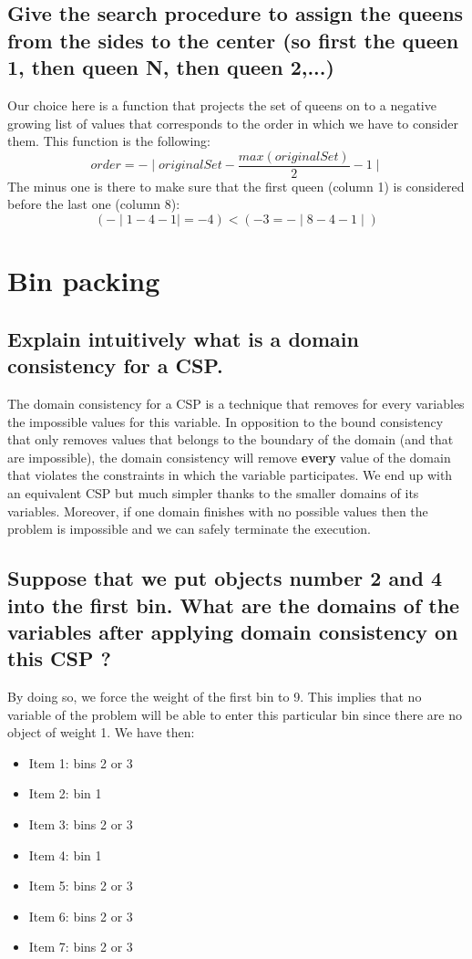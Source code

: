 \documentclass[a4paper ,12pt,french]{article}
\begin{document}
\subsection{Give the search procedure to assign the queens from the sides to the center (so first
the queen 1, then queen N, then queen 2,...)}
Our choice here is a function that projects the set of queens on to a negative growing list of values that corresponds to the order in which we have to consider them. This function is the following:
\begin{equation}
order = - \mid originalSet - \frac{max(originalSet)}{2} - 1 \mid
\end{equation}
The minus one is there to make sure that the first queen (column 1) is considered before the last one (column 8):
\begin{equation}
(-\mid 1-4-1\mid = -4) < (-3 = - \mid 8-4-1 \mid)
\end{equation}

\section{Bin packing}
\subsection{Explain intuitively what is a domain consistency for a CSP.}
The domain consistency for a CSP is a technique that removes for every variables the impossible values for this variable. In opposition to the bound consistency that only removes values that belongs to the boundary of the domain (and that are impossible), the domain consistency will remove \textbf{every} value of the domain that violates the constraints in which the variable participates. We end up with an equivalent CSP but much simpler thanks to the smaller domains of its variables. Moreover, if one domain finishes with no possible values then the problem is impossible and we can safely terminate the execution.  
\subsection{Suppose that we put objects number 2 and 4 into the first bin. What are the domains of the variables after applying domain consistency on this CSP ?}
By doing so, we force the weight of the first bin to 9. This implies that no variable of the problem will be able to enter this particular bin since there are no object of weight 1. We have then: \begin{itemize}
\item Item 1: bins 2 or 3
\item Item 2: bin 1
\item Item 3: bins 2 or 3
\item Item 4: bin 1
\item Item 5: bins 2 or 3
\item Item 6: bins 2 or 3
\item Item 7: bins 2 or 3

\end{itemize}
\end{document}
